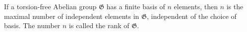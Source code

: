 If a torsion-free Abelian group $\mathfrak{G}$ has a finite basis of $n$ elements, then $n$ is the maximal number of independent elements in $\mathfrak{G}$, independent of the choice of basis. The number $n$ is called the rank of $\mathfrak{G}$.
